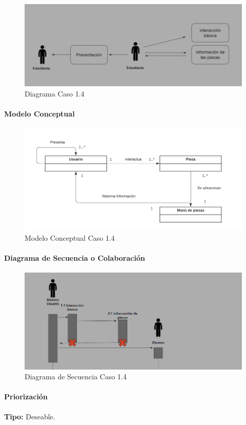 \begin{figure}[H]
\centerline{\includegraphics[width=15cm]{imgs/CasoUso_4.PNG}}
\caption{Diagrama Caso 1.4}
\label{fig_4_1}
\end{figure}

\paragraph{Modelo Conceptual}

\begin{figure}[H]
\centerline{\includegraphics[width=15cm]{imgs/ModeloConceptualCaso_4_3.png}}
\caption{Modelo Conceptual Caso 1.4}
\label{fig_4_2}
\end{figure}


\paragraph{Diagrama de Secuencia o Colaboración}

\begin{figure}[H]
\centerline{\includegraphics[width=15cm]{imgs/CasoUso_4_2.PNG}}
\caption{Diagrama de Secuencia Caso 1.4}
\label{fig_4_3}
\end{figure}

\paragraph{Priorización}
{\textbf {Tipo:}}
Deseable.